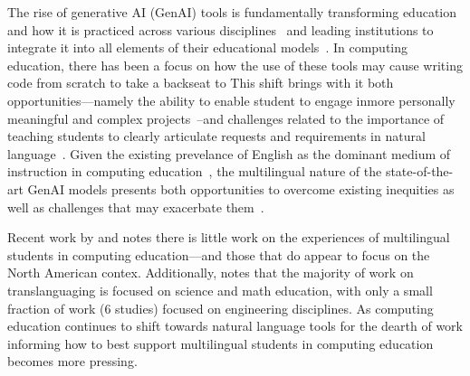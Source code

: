 
The rise of generative AI (GenAI) tools is fundamentally transforming education
and how it is practiced across various disciplines~\cite{prather2025beyond,
bond2024meta} and leading institutions to integrate it into all elements of
their educational models~\cite{southworth2025developing}. In computing
education, there has been a focus on how the use of these tools may cause
writing code from scratch to take a backseat to This shift brings with it both
opportunities---namely the ability to enable student to engage inmore
personally meaningful and complex projects~\cite{porter2024learn,
bottcher2025concepts}--and challenges related to the importance of teaching
students to clearly articulate requests and requirements in natural
language~\cite{becker2023programming, denny2024prompt, smith2024prompting,
reeves2024prompts}. Given the existing prevelance of English as the dominant
medium of instruction in computing education~\cite{guo2018non}, the multilingual
nature of the state-of-the-art GenAI models presents both opportunities to
overcome existing inequities as well as challenges that may exacerbate
them~\cite{yong2023prompting, smith2024explain, prather2025breaking}.

Recent work by \citet{jacob2022examining} and \citet{cheung2025systematic}
notes there is little work on the experiences of multilingual students in
computing education---and those that do appear to focus on the North American
contex. Additionally, \citet{cheung2025systematic} notes that the majority of
work on translanguaging is focused on science and math education, with only a
small fraction of work (6 studies) focused on engineering disciplines. As
computing education continues to shift towards natural language tools for 
the dearth of work informing how to best support multilingual students in
computing education becomes more pressing.

